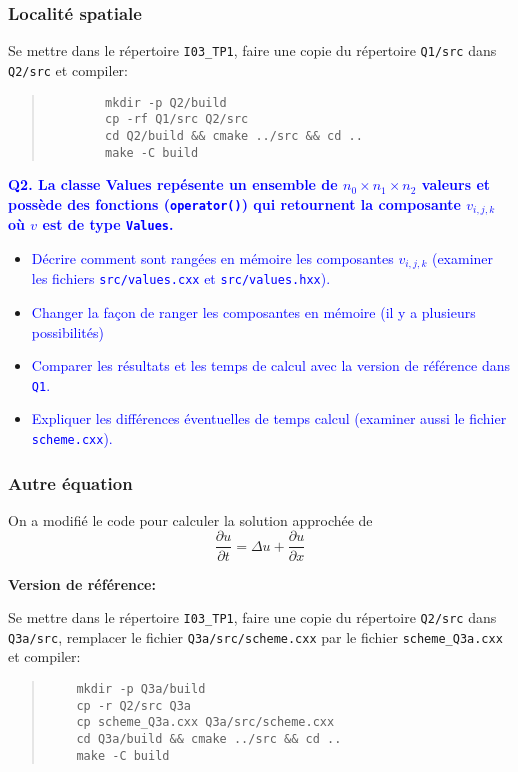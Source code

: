 \documentclass{beamer}
\begin{document}
\begin{frame}[fragile]
\frametitle{Localit\'e spatiale}
\vfill
    	
	Se mettre dans le r\'epertoire {\tt I03\_TP1}, faire une copie du r\'epertoire {\tt Q1/src} dans {\tt Q2/src} et compiler:
	
	\begin{quote}
		\begin{verbatim}
		mkdir -p Q2/build
		cp -rf Q1/src Q2/src
		cd Q2/build && cmake ../src && cd ..
		make -C build
		\end{verbatim}
	\end{quote}

\end{frame}

\begin{frame}[fragile]
	\vfill
	\textcolor{blue}{\bf Q2. La classe {Values} rep\'esente un ensemble de $n_0 \times n_1 \times n_2$ valeurs et poss\`ede des fonctions ({\tt operator()}) qui retournent la composante $v_{i,j,k}$ o\`u $v$ est de type {\tt Values}.}
	
	\vfill
	\begin{itemize}
		\item \textcolor{blue}{D\'ecrire comment sont rang\'ees en m\'emoire les composantes $v_{i,j,k}$
		(examiner les fichiers {\tt src/values.cxx} et {\tt src/values.hxx}).}
	\vfill
		\item \textcolor{blue}{Changer la fa\c{c}on de ranger les composantes en m\'emoire (il y a plusieurs possibilit\'es)}
	\vfill
		\item \textcolor{blue}{Comparer les r\'esultats et les temps de calcul avec la version de r\'ef\'erence dans {\tt Q1}.}
	\vfill
		\item \textcolor{blue}{Expliquer les diff\'erences \'eventuelles de temps calcul (examiner aussi le fichier {\tt scheme.cxx}).}
	\end{itemize}
	\vfill
	 
\end{frame}

\begin{frame}
	\frametitle{Autre \'equation}
	
	On a modifi\'e le code pour calculer la solution approch\'ee de 
	$$
	\frac{\partial u}{\partial t} = \Delta u + \frac{\partial u}{\partial x}
	$$
	
\vfill
\end{frame}

\begin{frame}[fragile]

{\bf Version de r\'ef\'erence:}
\vfill

Se mettre dans le r\'epertoire {\tt I03\_TP1}, faire une copie du r\'epertoire {\tt Q2/src} dans {\tt Q3a/src}, remplacer le fichier {\tt Q3a/src/scheme.cxx} par le fichier {\tt scheme\_Q3a.cxx} et compiler:
\begin{quote}
	\begin{verbatim}
	mkdir -p Q3a/build
	cp -r Q2/src Q3a
	cp scheme_Q3a.cxx Q3a/src/scheme.cxx
	cd Q3a/build && cmake ../src && cd ..
	make -C build
	\end{verbatim}
\end{quote}
\end{frame}
\end{document}
